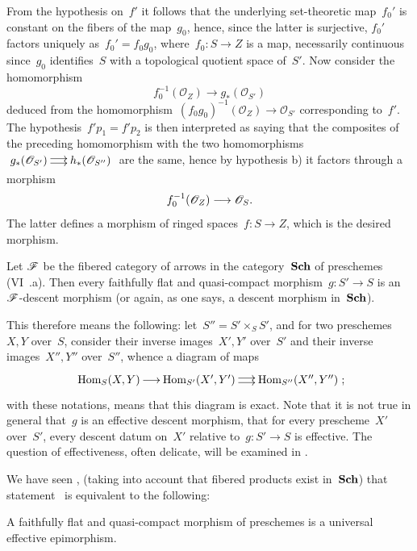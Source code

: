 From the hypothesis on~$f'$ it follows that the underlying
set-theoretic map~$f_{0}'$ is constant on the fibers of
the map~$g_{0}$, hence, since the latter is surjective,
$f_{0}'$ factors uniquely as~$f_{0}'=f_{0}g_{0}$,
where~$f_{0}\colon S\to Z$ is a map, necessarily
continuous since~$g_{0}$ identifies~$S$ with a topological
quotient space of~$S'$. Now consider the homomorphism
$$
f_{0}^{-1}(\mathcal{O}_{Z})\to g_*(\mathcal{O}_{S'})
$$
deduced from the homomorphism~$(f_{0}g_{0})^{-1}(\mathcal{O}_{Z})\to
\mathcal{O}_{S'}$ corresponding
to~$f'$. The hypothesis~$f'p_{1}=f'p_{2}$ is then interpreted
as saying that the composites of the preceding homomorphism
with the two homomorphisms
$\xymatrix@C=.5cm{g_*(\mathcal{O}_{S'})\ar@<2pt>[r]\ar@<-2pt>[r] &
h_*(\mathcal{O}_{S''})}$ are the same, hence by
hypothesis b) it factors through a morphism
$$
f_{0}^{-1}(\mathcal{O}_{Z})\to \mathcal{O}_{S}\quoi.
$$
The latter defines a morphism of ringed spaces~$f\colon
S\to Z$, which is the desired morphism.

\begin{theorem}
\label{VIII.5.2}
Let $\cal{F}$ be the fibered category of arrows in the
category~$\mathbf{Sch}$ of preschemes
\textup{(VI~.a)}. Then every faithfully flat and
quasi-compact morphism~$g\colon S'\to S$ is an
$\cal{F}$-descent morphism (or again, as one says, a descent
morphism in~$\mathbf{Sch}$).
\end{theorem}

This therefore means the following: let~$S''=S'\times_{S}S'$, and for two
preschemes~$X,Y$ over~$S$, consider their inverse
images~$X',Y'$ over~$S'$ and their inverse images~$X'',Y''$
over~$S''$, whence a diagram of maps
$$
\xymatrix@C=.5cm{\Hom_{S}(X,Y)\ar[r] &
\Hom_{S'}(X',Y')\ar@<2pt>[r]\ar@<-2pt>[r] & \Hom_{S''}(X'',Y'')}\quoi;
$$
with these notations,  means that this diagram is
exact. Note that it
is not true in general that~$g$ is an effective descent
morphism, \ie that for every prescheme~$X'$
over~$S'$, every descent datum on~$X'$ relative
to~$g\colon S'\to S$ is effective. The question of
effectiveness, often delicate, will be examined in
\No {}.

We have seen \cite{VIII.D}, (taking into account that fibered products
exist in~$\mathbf{Sch}$) that statement~ is equivalent to the following:

\begin{corollary}
\label{VIII.5.3}
A faithfully flat and quasi-compact morphism of
preschemes is a universal effective epimorphism.
\end{corollary}

